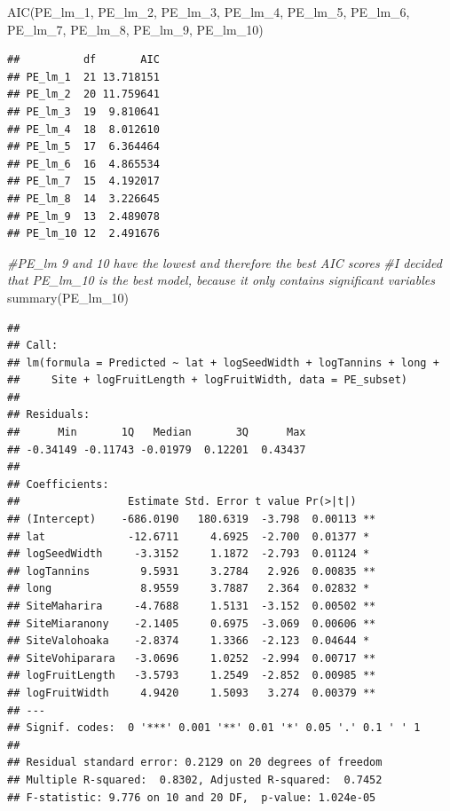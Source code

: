 \documentclass[
  12pt,
]{article}
\newenvironment{Shaded}{\begin{snugshade}}{\end{snugshade}}
\newcommand{\CommentTok}[1]{\textcolor[rgb]{0.56,0.35,0.01}{\textit{#1}}}
\newcommand{\FunctionTok}[1]{\textcolor[rgb]{0.00,0.00,0.00}{#1}}
\newcommand{\NormalTok}[1]{#1}
\begin{document}
\begin{Shaded}
\begin{Highlighting}[]
\FunctionTok{AIC}\NormalTok{(PE\_lm\_1, PE\_lm\_2, PE\_lm\_3, PE\_lm\_4, PE\_lm\_5, PE\_lm\_6, PE\_lm\_7, PE\_lm\_8, PE\_lm\_9, PE\_lm\_10)}
\end{Highlighting}
\end{Shaded}

\begin{verbatim}
##          df       AIC
## PE_lm_1  21 13.718151
## PE_lm_2  20 11.759641
## PE_lm_3  19  9.810641
## PE_lm_4  18  8.012610
## PE_lm_5  17  6.364464
## PE_lm_6  16  4.865534
## PE_lm_7  15  4.192017
## PE_lm_8  14  3.226645
## PE_lm_9  13  2.489078
## PE_lm_10 12  2.491676
\end{verbatim}

\begin{Shaded}
\begin{Highlighting}[]
\CommentTok{\#PE\_lm 9 and 10 have the lowest and therefore the best AIC scores}
\CommentTok{\#I decided that PE\_lm\_10 is the best model, because it only contains significant variables}
\FunctionTok{summary}\NormalTok{(PE\_lm\_10)}
\end{Highlighting}
\end{Shaded}

\begin{verbatim}
## 
## Call:
## lm(formula = Predicted ~ lat + logSeedWidth + logTannins + long + 
##     Site + logFruitLength + logFruitWidth, data = PE_subset)
## 
## Residuals:
##      Min       1Q   Median       3Q      Max 
## -0.34149 -0.11743 -0.01979  0.12201  0.43437 
## 
## Coefficients:
##                 Estimate Std. Error t value Pr(>|t|)   
## (Intercept)    -686.0190   180.6319  -3.798  0.00113 **
## lat             -12.6711     4.6925  -2.700  0.01377 * 
## logSeedWidth     -3.3152     1.1872  -2.793  0.01124 * 
## logTannins        9.5931     3.2784   2.926  0.00835 **
## long              8.9559     3.7887   2.364  0.02832 * 
## SiteMaharira     -4.7688     1.5131  -3.152  0.00502 **
## SiteMiaranony    -2.1405     0.6975  -3.069  0.00606 **
## SiteValohoaka    -2.8374     1.3366  -2.123  0.04644 * 
## SiteVohiparara   -3.0696     1.0252  -2.994  0.00717 **
## logFruitLength   -3.5793     1.2549  -2.852  0.00985 **
## logFruitWidth     4.9420     1.5093   3.274  0.00379 **
## ---
## Signif. codes:  0 '***' 0.001 '**' 0.01 '*' 0.05 '.' 0.1 ' ' 1
## 
## Residual standard error: 0.2129 on 20 degrees of freedom
## Multiple R-squared:  0.8302, Adjusted R-squared:  0.7452 
## F-statistic: 9.776 on 10 and 20 DF,  p-value: 1.024e-05
\end{verbatim}
\end{document}
